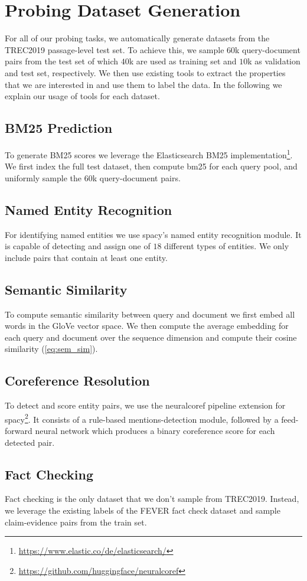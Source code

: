 \section{Probing Dataset Generation}
\label{sec:dataset_gen}
For all of our probing tasks, we automatically generate datasets from the TREC2019 passage-level test set. To achieve this, we sample $60$k query-document pairs from the test set of which $40$k are used as training set and $10$k as validation and test set, respectively. We then use existing tools to extract the properties that we are interested in and use them to label the data. In the following we explain our usage of tools for each dataset.

\subsection{BM25 Prediction}
To generate BM25 scores we leverage the Elasticsearch BM25 implementation\footnote{\url{https://www.elastic.co/de/elasticsearch/}}. We first index the full test dataset, then compute bm25 for each query pool, and uniformly sample the $60$k query-document pairs.

\subsection{Named Entity Recognition}
For identifying named entities we use spacy's \cite{spacy2} named entity recognition module. It is capable of detecting and assign one of $18$ different types of entities. We only include pairs that contain at least one entity.


\subsection{Semantic Similarity}
To compute semantic similarity between query and document we first embed all words in the GloVe \cite{pennington2014glove} vector space. We then compute the average embedding for each query and document over the sequence dimension and compute their cosine similarity (\autoref{eq:sem_sim}).

\subsection{Coreference Resolution}
To detect and score entity pairs, we use the neuralcoref pipeline extension for spacy\footnote{\url{https://github.com/huggingface/neuralcoref}}. It consists of a rule-based mentions-detection module, followed by a feed-forward neural network which produces a binary coreference score for each detected pair.

\subsection{Fact Checking}
Fact checking is the only dataset that we don't sample from TREC2019. Instead, we leverage the existing labels of the FEVER fact check dataset \cite{thorne-etal-2018-fever} and sample claim-evidence pairs from the train set.